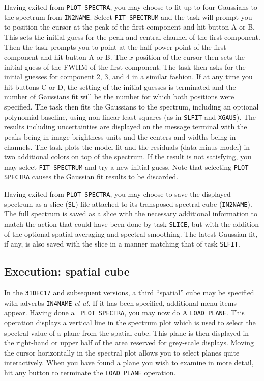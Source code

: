 \documentclass[twoside]{article}
\newcommand{\Me}[1]{\textcolor{mecol}{#1}}
\begin{document}
Having exited from {\tt PLOT SPECTRA}, you may choose to fit up to
four Gaussians to the spectrum from {\tt IN2NAME}.  Select {\tt FIT
  SPECTRUM} and the task will prompt you to position the cursor at the
peak of the first component and hit button A or B.  This sets the
initial guess for the peak and central channel of the first component.
Then the task prompts you to point at the half-power point of the
first component and hit button A or B.  The $x$ position of the cursor
then sets the initial guess of the FWHM of the first component.  The
task then asks for the initial guesses for component 2, 3, and 4 in a
similar fashion.  If at any time you hit buttons C or D, the setting
of the initial guesses is terminated and the number of Gaussians fit
will be the number for which both positions were specified.  The task
then fits the Gaussians to the spectrum, including an optional
polynomial baseline, using non-linear least squares (as in {\tt SLFIT}
and {\tt XGAUS})\@.  The results including uncertainties are displayed
on the message terminal with the peaks being in image brightness units
and the centers and widths being in channels.  The task plots the
model fit and the residuals (data minus model) in two additional
colors on top of the spectrum.  If the result is not satisfying, you
may select {\tt FIT SPECTRUM} and try a new initial guess.  Note that
selecting {\tt PLOT SPECTRA} causes the Gaussian fit results to be
discarded.

Having exited from {\tt PLOT SPECTRA}, you may choose to save the
displayed spectrum as a slice ({\tt SL}) file attached to its
transposed spectral cube ({\tt IN2NAME})\@.  The full spectrum is
saved as a slice with the necessary additional information to match
the action that could have been done by task {\tt SLICE}, but with the
addition of the optional spatial averaging and spectral smoothing.
The latest Gaussian fit, if any, is also saved with the slice in a
manner matching that of task {\tt SLFIT}\@.


\subsection{Execution: spatial cube}

\Me{In the {\tt 31DEC17} and subsequent versions, a third ``spatial''
cube may be specified with adverbs {\tt IN4NAME} {\it et al.}  If it
has been specified, additional menu items appear.  Having done a {\tt
  PLOT SPECTRA}, you may now do A {\tt LOAD PLANE}\@.  This operation
displays a vertical line in the spectrum plot which is used to select
the spectral value of a plane from the spatial cube.  This plane is
then displayed in the right-hand or upper half of the area reserved
for grey-scale displays.  Moving the cursor horizontally in the
spectral plot allows you to select planes quite interactively.  When
you have found a plane you wish to examine in more detail, hit any
button to terminate the {\tt LOAD PLANE} operation.}
\end{document}
